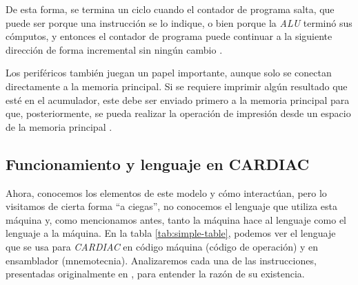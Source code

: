 \documentclass[letterpaper,12pt,oneside]{book}
\begin{document}
	De esta forma, se termina un ciclo cuando el contador de programa salta,
	 que puede ser porque una instrucción se lo indique, o bien porque
	la \textit{ALU} terminó sus cómputos, y entonces el contador de programa puede continuar
	 a la siguiente dirección de forma incremental
	sin ningún cambio \cite{fingerman_instruction_1968}.
	
	Los periféricos también juegan un papel importante, aunque solo se conectan
	directamente a la memoria principal. Si se requiere imprimir algún resultado que esté
	en el acumulador, este debe ser enviado primero
	a la memoria principal para que, posteriormente, se pueda realizar la operación de impresión desde un espacio de la memoria principal 
	\cite{fingerman_instruction_1968}.
	
	\subsection{Funcionamiento y lenguaje en CARDIAC}	
	
	Ahora, conocemos los elementos de este modelo y cómo interactúan, pero lo visitamos de cierta forma ``a ciegas'', no conocemos el lenguaje
	que utiliza esta máquina y, como mencionamos antes, tanto la máquina hace al lenguaje como el lenguaje a la máquina. En la tabla \ref{tab:simple-table}, podemos ver el lenguaje que se usa para  \textit{CARDIAC} en código máquina (código de operación) y 
	en 	ensamblador (mnemotecnia). Analizaremos cada una de las instrucciones, presentadas
	originalmente en \cite{fingerman_instruction_1968}, para entender la razón de su 
	existencia.
	
\end{document}

